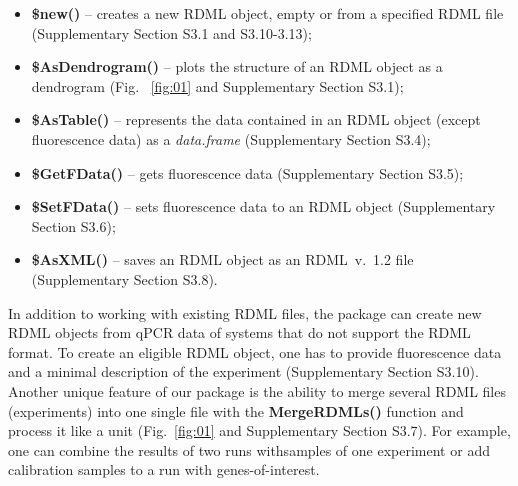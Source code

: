 \documentclass{bioinfo}
\begin{document}
\begin{itemize} 
\item \textbf{\$new()} -- creates a new RDML object,  empty or from a specified RDML 
file (Supplementary Section S3.1 and S3.10-3.13);
\item \textbf{\$AsDendrogram()} -- plots the
structure of an RDML object as a dendrogram  (Fig.~ \ref{fig:01} and Supplementary Section 
S3.1);
\item \textbf{\$AsTable()} -- represents the data contained in an RDML object (except 
fluorescence data) as a \textit{data.frame} (Supplementary Section S3.4);
\item \textbf{\$GetFData()} -- gets fluorescence data (Supplementary Section S3.5);
\item \textbf{\$SetFData()} -- sets fluorescence data to an RDML object (Supplementary Section S3.6); 
\item \textbf{\$AsXML()} – saves an RDML object as an RDML~v.~1.2 file (Supplementary Section S3.8).
\end{itemize}
In addition to working with existing RDML files, the package can create new RDML 
objects from  qPCR data  of systems that do not support the RDML format. To 
create an eligible RDML object, one has to provide fluorescence data and a minimal  
description of the experiment (Supplementary Section S3.10). Another unique feature of our 
package is the ability to merge several RDML files (experiments) into one single file with the 
\textbf{MergeRDMLs()} function and process  it like a unit (Fig.~\ref{fig:01} and Supplementary Section 
S3.7). For example,  one can combine the results of two runs withsamples of one 
experiment or add calibration samples to a run with genes-of-interest.
\end{document}
